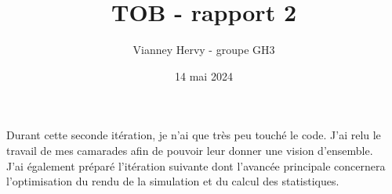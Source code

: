 \documentclass{article}
\title{TOB - rapport 2}
\author{Vianney Hervy - groupe GH3}
\date{14 mai 2024}
\begin{document}
\maketitle

Durant cette seconde itération, je n'ai que très peu touché le code. J'ai relu le travail de mes camarades afin de pouvoir leur donner une vision d'ensemble. \\

J'ai également préparé l'itération suivante dont l'avancée principale concernera l'optimisation du rendu de la simulation et du calcul des statistiques.
\end{document}
